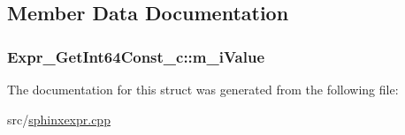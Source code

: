 \subsection{Member Data Documentation}
\hypertarget{structExpr__GetInt64Const__c_a85f87031565259b32eaa21c125c74686}{
\subsubsection[{m\-\_\-i\-Value}]{ Expr\-\_\-\-Get\-Int64\-Const\-\_\-c\-::m\-\_\-i\-Value}}\label{structExpr__GetInt64Const__c_a85f87031565259b32eaa21c125c74686}


The documentation for this struct was generated from the following file\-:\begin{DoxyCompactItemize}
\item 
src/\hyperlink{sphinxexpr_8cpp}{sphinxexpr.\-cpp}\end{DoxyCompactItemize}
